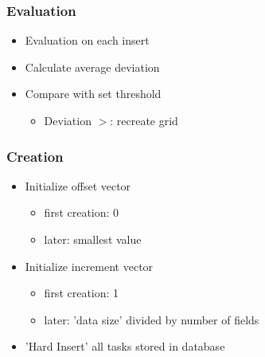 \begin{frame}
	\frametitle{Evaluation}
		\begin{itemize}
			\item<2-> {Evaluation on each insert}
			\item<3-> {Calculate average deviation}
			\item<4-> {Compare with set threshold}
			\begin{itemize}
				\item<5->{Deviation $>$: recreate grid}
			\end{itemize}
		\end{itemize}
\end{frame}	
	
\begin{frame}
	\frametitle{Creation}
		\begin{itemize}
			\item<2-> {Initialize offset vector}
			\begin{itemize}
				\item<3-> {first creation: 0}
				\item<4-> {later: smallest value}
			\end{itemize}
			\item<5-> {Initialize increment vector}
			\begin{itemize}
				\item<6->{first creation: 1}
				\item<7->{later: 'data size' divided by number of fields}
			\end{itemize}
			\item<8-> {'Hard Insert' all tasks stored in database}			
		\end{itemize}
\end{frame}

